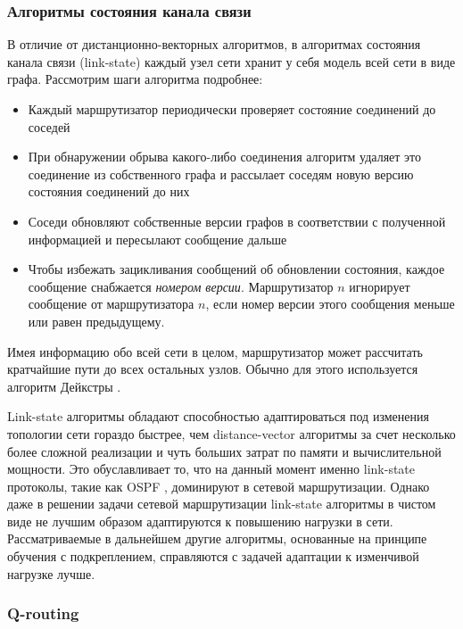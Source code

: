 \documentclass[specification,annotation,times]{itmo-student-thesis}
\theoremstyle{definition}
\begin{document}
\subsubsection{Алгоритмы состояния канала связи}

В отличие от дистанционно-векторных алгоритмов, в алгоритмах состояния канала связи
(link-state) каждый узел сети хранит у себя модель всей сети в виде графа.
Рассмотрим шаги алгоритма подробнее:

\begin{itemize}
\item Каждый маршрутизатор периодически проверяет состояние соединений до
  соседей
\item При обнаружении обрыва какого-либо соединения алгоритм удаляет это
  соединение из собственного графа и рассылает соседям новую версию состояния
  соединений до них
\item Соседи обновляют собственные версии графов в соответствии с полученной
  информацией и пересылают сообщение дальше
\item Чтобы избежать зацикливания сообщений об обновлении состояния, каждое
  сообщение снабжается \textit{номером версии}. Маршрутизатор $n$ игнорирует
  сообщение от маршрутизатора $n$, если номер версии этого сообщения меньше или
  равен предыдущему.
\end{itemize}

Имея информацию обо всей сети в целом, маршрутизатор может рассчитать кратчайшие
пути до всех остальных узлов. Обычно для этого используется алгоритм
Дейкстры \cite{dijkstra}. 

Link-state алгоритмы обладают способностью адаптироваться под изменения
топологии сети гораздо быстрее, чем distance-vector алгоритмы за счет
несколько более сложной реализации и чуть больших затрат по памяти и
вычислительной мощности. Это обуславливает то, что на данный момент именно
link-state протоколы, такие как OSPF \cite{ospf-rfc}, доминируют в сетевой
маршрутизации. Однако даже в решении задачи сетевой маршрутизации link-state
алгоритмы в чистом виде не лучшим образом адаптируются к повышению нагрузки в
сети. Рассматриваемые в дальнейшем другие алгоритмы, основанные на принципе
обучения с подкреплением, справляются с задачей адаптации к
изменчивой нагрузке лучше.

\subsubsection{Q-routing}\label{q-routing-desc}
\end{document}
